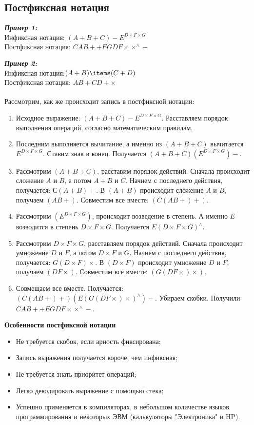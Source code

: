 \subsection{Постфиксная нотация}
\textbf{\emph{Пример 1:}}
\\Инфиксная нотация: $(A + B + C) - E^{D\times F\times G}$
\\Постфиксная нотация: $CAB++EGDF\times\times ^{\wedge}-$
\\
\par\textbf{\emph{Пример 2:}}
\\Инфиксная нотация:$ ( A + B ) \items ( C + D )$
\\Постфиксная нотация: $A B + C D + \times$
\\
\\Рассмотрим, как же происходит запись в постфиксной нотации:
\begin{enumerate}
\item Исходное выражение: $(A + B + C) - E^{D\times F\times G}$. Расставляем порядок выполнения операций, согласно математическим правилам.
\item Последним выполняется вычитание, а именно из $(A + B + C)$ вычитается $E^{D\times F\times G}$. Ставим знак в конец. Получается $(A + B + C)(E^{D\times F\times G})-$.
\item Рассмотрим $(A + B + C)$, расставим порядок действий. Сначала происходит сложение $A$ и $B$, а потом $A+B$ и $C$. Начнем с последнего действия, получается: $С(A+B)+$. В $(A+B)$ происходит сложение $A$ и $B$, получаем $(AB+)$. Совместим все вместе: $(C(AB+)+)$.
\item Рассмотрим $(E^{D\times F\times G})$, происходит возведение в степень. А именно $E$ возводится в степень $D\times F\times G$. Получается $E(D\times F\times G)^{\wedge}$.
\item Рассмотрим $D\times F\times G$, расставляем порядок действий. Сначала происходит умножение $D$ и $F$, а потом $D\times F$ и $G$. Начнем с последнего действия, получается: $G(D \times F)\times$. В $(D \times F)$ происходит умножение $D$ и $F$, получаем $(DF\times)$. Совместим все вместе: $(G(DF\times )\times)$.
\item Совмещаем все вместе. Получается: $(C(AB+)+)(E(G(DF\times)\times)^{\wedge})-$. Убираем скобки. Получили $CAB++EGDF\times\times ^{\wedge}-$.
\end{enumerate}
\begin{center}
  \textbf{Особенности постфиксной нотации}
\end{center}
\begin{itemize}
  \item Не требуется скобок, если арность фиксирована;
  \item Запись выражения получается короче, чем инфиксная;
  \item Не требуется знать приоритет операций;
  \item Легко декодировать выражение с помощью стека;
  \item Успешно применяется в компиляторах, в небольшом количестве языков программирования и некоторых ЭВМ (калькуляторы "Электроника" и HP).
\end{itemize}
